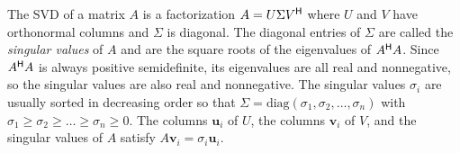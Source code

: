 The SVD of a matrix $A$ is a factorization $A = U \Sigma V^{\mathsf H}$ where $U$ and $V$ have orthonormal columns and $\Sigma$ is diagonal.
The diagonal entries of $\Sigma$ are called the \emph{singular values} of $A$ and are the square roots of the eigenvalues of $A^{\mathsf H} A$.
Since $A^{\mathsf H} A$ is always positive semidefinite, its eigenvalues are all real and nonnegative, so the singular values are also real and nonnegative.
The singular values $\sigma_i$ are usually sorted in decreasing order so that $ \Sigma = \mbox{diag}(\sigma_1,\sigma_2,\ldots,\sigma_n)$ with $\sigma_1 \geq \sigma_2 \geq \ldots \geq \sigma_n \geq 0$.
The columns $\mathbf{u}_i$ of $U$, the columns $\mathbf{v}_i$ of $V$, and the singular values of $A$ satisfy $A\mathbf{v}_i = \sigma_i \mathbf{u}_i$.

